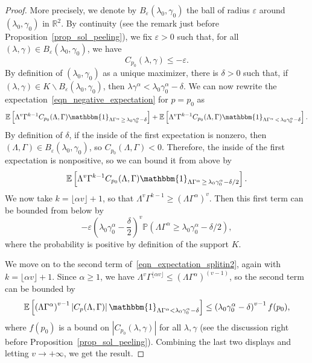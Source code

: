 \documentclass[10pt]{amsart}
\theoremstyle{definition}\newtheorem{defi}[theo]{Definition}\newtheorem{rema}[theo]{Remark}\newtheorem{exam}[theo]{Example}\newtheorem{exem}[theo]{Example}\newtheorem{nota}[theo]{Notation}
\newcommand{\eps}{\varepsilon}
\newcommand{\R}{\mathbb{R}}
\newcommand{\E}{\mathbb{E}}
\renewcommand{\P}{\mathbb{P}}
\newcommand{\bbmun}{\mathbbm{1}}
\begin{document}
\begin{proof}
More precisely, we denote by $B_{\eps}(\lambda_0, \gamma_0)$ the ball of radius $\eps$ around $(\lambda_0,\gamma_0)$ in $\R^2$. By continuity (see the remark just before Proposition~\ref{prop_sol_peeling}), we fix $\eps>0$ such that, for all $(\lambda, \gamma) \in B_{\eps}(\lambda_0,\gamma_0)$, we have
\[
C_{p_0}(\lambda, \gamma) \leq -\eps.
\]
By definition of $(\lambda_0, \gamma_0)$ as a unique maximizer, there is $\delta>0$ such that, if $(\lambda, \gamma) \in K \backslash B_{\eps}(\lambda_0, \gamma_0)$, then $\lambda \gamma^{\alpha} < \lambda_0 \gamma_0^{\alpha}-\delta$. We can now rewrite the expectation~\eqref{eqn_negative_expectation} for $p=p_0$ as
\begin{equation}\label{eqn_expectation_splitin2}
\E \left[\Lambda^v \Gamma^{k-1} C_{p_0}(\Lambda, \Gamma) \bbmun_{\Lambda \Gamma^{\alpha}\,\geq \,\lambda_0 \gamma_0^{\alpha}-\delta} \right] + \E \left[\Lambda^v \Gamma^{k-1} C_{p_0}(\Lambda, \Gamma) \bbmun_{\Lambda \Gamma^{\alpha}\,<\,\lambda_0 \gamma_0^{\alpha}-\delta} \right].
\end{equation}
By definition of $\delta$, if the inside of the first expectation is nonzero, then $(\Lambda, \Gamma) \in B_{\eps}(\lambda_0,\gamma_0)$, so $C_{p_0}(\Lambda, \Gamma)<0$. Therefore, the inside of the first expectation is nonpositive, so we can bound it from above by
\[
\E \left[\Lambda^v \Gamma^{k-1} C_{p_0}(\Lambda, \Gamma) \bbmun_{\Lambda \Gamma^{\alpha}\,\geq\,\lambda_0 \gamma_0^{\alpha}-\delta/2} \right].
\]
We now take $k = \lfloor \alpha v \rfloor+1$, so that $\Lambda^v \Gamma^{k-1} \geq (\Lambda \Gamma^{\alpha})^v$. Then this first term can be bounded from below by
\[
-\eps \left(\lambda_0 \gamma_0^{\alpha}-\frac{\delta}{2} \right)^v \P \left(\Lambda \Gamma^{\alpha} \geq \lambda_0 \gamma_0^{\alpha}-\delta/2 \right),
\]
where the probability is positive by definition of the support $K$.

We move on to the second term of~\eqref{eqn_expectation_splitin2}, again with $k = \lfloor \alpha v \rfloor+1$. Since $\alpha \geq 1$, we have $\Lambda^v \Gamma^{\lfloor \alpha v \rfloor} \leq (\Lambda \Gamma^{\alpha})^{(v-1)}$, so the second term can be bounded by
\[
\E \left[\left(\Lambda \Gamma^{\alpha} \right)^{v-1} \left| C_p(\Lambda, \Gamma) \right| \bbmun_{\Lambda \Gamma^{\alpha} < \lambda_0 \gamma_0^{\alpha}-\delta} \right] \leq \left(\lambda_0 \gamma_0^{\alpha} -\delta \right)^{v-1} f(p_0),
\]
where $f(p_0)$ is a bound on $|C_{p_0}(\lambda, \gamma)|$ for all $\lambda, \gamma$ (see the discussion right before Proposition~\ref{prop_sol_peeling}). Combining the last two displays and letting $v \to +\infty$, we get the result.
\end{proof}
\end{document}
